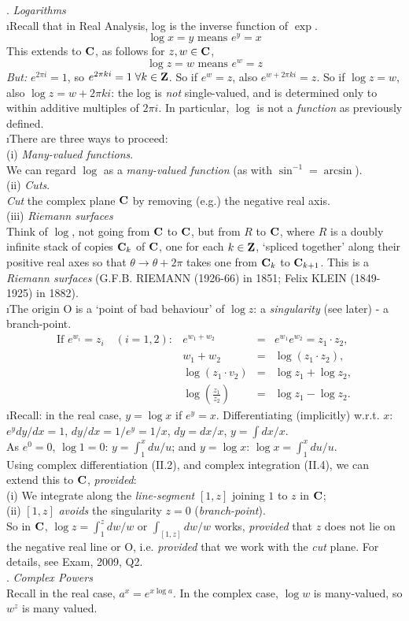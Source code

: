 \documentclass[12pt]{article}
\begin{document}
. {\it Logarithms}\\
\i Recall that in Real Analysis, log is the inverse function of
$\exp$.
    \[\log x=y \textrm{ means } e^y=x\]
This extends to ${\bf C}$, as follows for $z,w\in {\bf C}$,
    \[\log z=w \textrm{ means } e^w=z\]
\emph{But:} $e^{2\pi i}=1$, so $e^{2\pi ki}=1\;\forall k\in {\bf Z}$. So if $e^w=z$, also
$e^{w+2\pi k i}=z$. So if $\log z=w$, also $\log z=w+2\pi ki$: the log is \emph{not}
single-valued, and is determined only to within additive multiples of $2\pi i$. In
particular, $\log$ is not a \emph{function} as previously defined.\\
\i There are three ways to proceed:\\
(i) {\it Many-valued functions}.\\
We can regard $\log$ as a \emph{many-valued function} (as with
$\sin^{-1}=\arcsin$).\\
(ii) {\it Cuts}.\\
\emph{Cut} the complex plane ${\bf C}$ by removing (e.g.) the
negative real axis.\\
(iii) {\it Riemann surfaces}\\
Think of $\log$, not going from ${\bf C}$ to ${\bf C}$, but from
$R$ to ${\bf C}$, where $R$ is a doubly infinite stack of copies
${\bf C}_k$ of ${\bf C}$, one for each $k\in{\bf Z}$, `spliced
together' along their positive real axes so that
$\theta\rightarrow\theta+2\pi$ takes one from ${\bf C}_k$ to ${\bf
C }_{k+1}$. This is a \emph{Riemann surfaces} (G.F.B. RIEMANN
(1926-66) in 1851; Felix KLEIN (1849-1925) in 1882).\\
\i The origin O is a `point of bad behaviour' of $\log z$: a
\emph{singularity} (see later) - a branch-point.
\[\begin{array}{rrcl}
\textrm{If }e^{w_i}=z_i \quad (i=1,2): & e^{w_1+w_2}&=&e^{w_1}e^{w_2}=z_1\cdot z_2,\\
&w_1+w_2&=&\log(z_1\cdot z_2),\\
&\log(z_1\cdot v_2)&=&\log z_1 + \log z_2,\\
&\log\left(\frac{z_1}{z_2}\right)&=&\log z_1 - \log z_2.
\end{array}\]
\i Recall: in the real case, $y=\log x$ if $e^y=x$.
Differentiating (implicitly) w.r.t. $x$: $e^y dy/dx=1$, $dy/dx=1/{e^y}=1/x$, $dy=dx/x$,
$y=\int dx/x$.\\
As $e^0=0$, $\log 1=0$: $y=\int_1^x du/u$; and $y=\log x$: $\log x =\int_1^x du/u$.\\
Using complex differentiation (II.2), and complex integration (II.4), we can extend this to
${\bf C}$, \emph{provided}:\\
(i) We integrate along the \emph{line-segment} $[1,z]$ joining $1$ to $z$ in ${\bf C}$;\\
(ii) $[1,z]$ \emph{avoids} the singularity $z=0$ (\emph{branch-point}).\\
So in ${\bf C}$, $\log z=\int_1^z dw/w$ or
$\int_{[1,z]} dw/w$ works, \emph{provided} that $z$ does
not lie on the negative real line or O, i.e. \emph{provided} that
we work with the \emph{cut} plane. For details, see Exam, 2009, Q2.\\

. {\it Complex Powers}\\
Recall in the real case, $a^x=e^{x\log a}$. In the complex case,
$\log w$ is many-valued, so $w^z$ is many valued.
\end{document}
